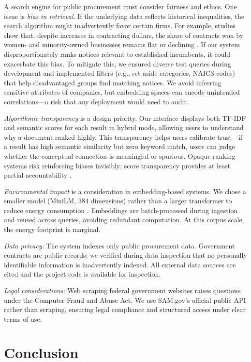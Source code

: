\documentclass[10pt,twocolumn]{article}
\begin{document}
A search engine for public procurement must consider fairness and ethics. One issue is \textit{bias in retrieval}. If the underlying data reflects historical inequalities, the search algorithm might inadvertently favor certain firms. For example, studies show that, despite increases in contracting dollars, the share of contracts won by women- and minority-owned businesses remains flat or declining \cite{HigherGov2022}. If our system disproportionately ranks notices relevant to established incumbents, it could exacerbate this bias. To mitigate this, we ensured diverse test queries during development and implemented filters (e.g., set-aside categories, NAICS codes) that help disadvantaged groups find matching notices. We avoid inferring sensitive attributes of companies, but embedding spaces can encode unintended correlations---a risk that any deployment would need to audit.

\textit{Algorithmic transparency} is a design priority. Our interface displays both TF-IDF and semantic scores for each result in hybrid mode, allowing users to understand why a document ranked highly. This transparency helps users calibrate trust---if a result has high semantic similarity but zero keyword match, users can judge whether the conceptual connection is meaningful or spurious. Opaque ranking systems risk reinforcing biases invisibly; score transparency provides at least partial accountability \cite{Rayo2025}.

\textit{Environmental impact} is a consideration in embedding-based systems. We chose a smaller model (MiniLM, 384 dimensions) rather than a larger transformer to reduce energy consumption \cite{SBERTHome}. Embeddings are batch-processed during ingestion and reused across queries, avoiding redundant computation. At this corpus scale, the energy footprint is marginal.

\textit{Data privacy:} The system indexes only public procurement data. Government contracts are public records; we verified during data inspection that no personally identifiable information is inadvertently indexed. All external data sources are cited and the project code is available for inspection.

\textit{Legal considerations:} Web scraping federal government websites raises questions under the Computer Fraud and Abuse Act. We use SAM.gov's official public API rather than scraping, ensuring legal compliance and structured access under clear terms of use.

\section{Conclusion}
\end{document}
